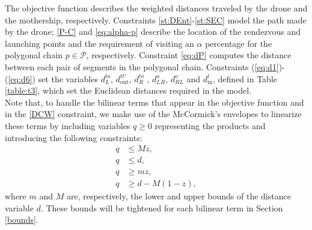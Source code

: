 \noindent
The objective function describes the weighted distances traveled by the drone and the mothership, respectively. Constraints \eqref{st:DEnt}-\eqref{st:SEC} model the path made by the drone; \eqref{P-C} and \eqref{eq:alpha-p} describe the location of the rendezvous and launching points and the requirement of visiting an $\alpha$ percentage for the polygonal chain $p\in\mathcal P$, respectively. Constraint \eqref{eq:dP} computes the distance between each pair of segments in the polygonal chain. Constraints (\ref{eq:d1})-(\ref{eq:d6}) set the variables $d_L^{to}$, $d_{\text{out}}^{tt'}$, $d_R^{to}$ , $d_{LR}^o$, $d_{RL}^o$ and $d_{\text{in}}^{t}$, defined in Table \ref{table:t3}, which set the Euclidean distances required in the model. \\



Note that, to handle the bilinear terms that appear in the objective function and in the \eqref{DCW} constraint, we make use of the McCormick's envelopes to linearize these terms by including variables $q\geq 0$  representing the products and introducing the following constraints:
\begin{align*}
    q & \leq  M z, \\
    q & \leq  d, \\
    q & \geq m z, \\
    q & \geq d - M(1 - z),
\end{align*}
where $m$ and $M$ are, respectively, the lower and upper bounds of the distance variable $d$. These bounds will be tightened for each bilinear term in Section \ref{bounds}.

